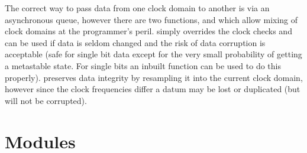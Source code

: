         The correct way to pass data from one clock domain to another is via an
        asynchronous queue, however there are two functions,  and
         which allow mixing of clock domains at the programmer's
        peril.  simply overrides the clock checks and can be used if
        data is seldom changed and the risk of data corruption is acceptable (safe
        for single bit data except for the very small probability of getting a
        metastable state. For single bits an inbuilt function  can be
        used to do this properly).  preserves data integrity by
        resampling it into the current clock domain, however since the clock
        frequencies differ a datum may be lost or duplicated (but will not be
        corrupted).


    \section{Modules}


